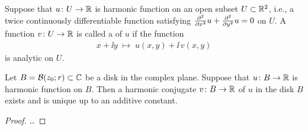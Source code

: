 \begin{definition}
  \label{def:harmonic_conjugate}
  Suppose that $u \colon U \to \bR$ is harmonic function
  on an open subset $U \subset \bR^2$, i.e., a twice continuously
  differentiable function satisfying $\pdder{x} u + \pdder{y} u = 0$
  on $U$. A function $v \colon U \to \bR$ is called a
   of $u$ if the function
  \begin{align*}
    x + \ii y \; \mapsto \; u(x,y) + \ii \, v(x,y)
  \end{align*}
  is analytic on $U$.
\end{definition}

\begin{lemma}
  \label{lem:harmonic_conjugate_existence}
  Let $B = \BallRC{r}{z_0} \subset \bC$ be a disk in the complex plane.
  Suppose that $u \colon B \to \bR$ is harmonic function on $B$. Then a
  harmonic conjugate $v \colon B \to \bR$ of $u$ in the disk $B$ exists and
  is unique up to an additive constant.
\end{lemma}
\begin{proof}
  \ldots
\end{proof}
